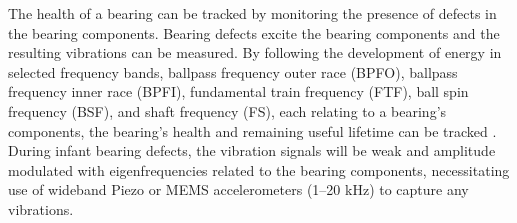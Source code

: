 \documentclass[letterpaper]{article} %
\begin{document}




The health of a bearing can be tracked by monitoring the presence of defects in the bearing components. Bearing defects excite the bearing components and the resulting vibrations can be measured. By following the development of energy in selected frequency bands, ballpass frequency outer race (BPFO), ballpass frequency inner race (BPFI), fundamental train frequency (FTF), ball spin frequency (BSF), and shaft frequency (FS), each relating to a bearing's components, the bearing's health and remaining useful lifetime can be tracked \cite{wang_predictive_2017, randall_vibration_2021}. During infant bearing defects, the vibration signals will be weak and amplitude modulated with eigenfrequencies related to the bearing components, necessitating use of wideband Piezo or MEMS accelerometers (1--20 kHz) to capture any vibrations.
\end{document}

